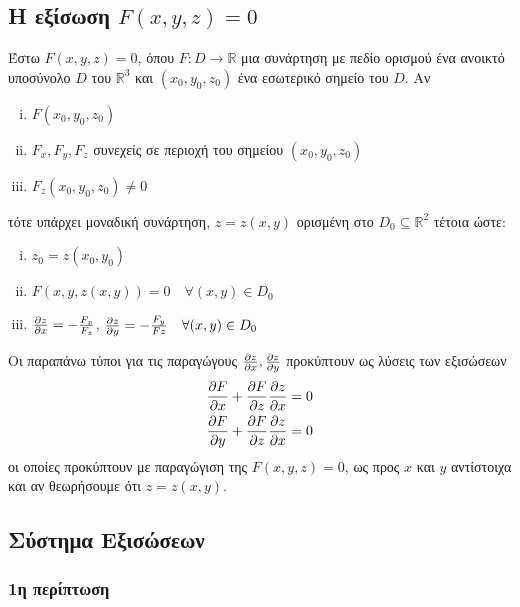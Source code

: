 \subsection{Η εξίσωση $ F(x,y,z) = 0 $}


Έστω $ F(x,y,z) = 0 $, όπου $F\colon D \to \mathbb{R}$ μια συνάρτηση με πεδίο ορισμού ένα ανοικτό
υποσύνολο $ D $ του $ \mathbb{R}^{3}  $ και $ (x_0,y_0,z_0) $ ένα εσωτερικό σημείο του $ D $. Αν
\begin{enumerate}[(i)]
	\item $ F(x_0,y_0,z_0) $
	\item $ F_x, F_y, F_z $ συνεχείς σε περιοχή του σημείου $ (x_0,y_0,z_0) $
	\item $ F_z(x_0,y_0,z_0) \neq 0 $
\end{enumerate}
τότε υπάρχει μοναδική συνάρτηση, $ z=z(x,y) $ ορισμένη στο $ D_0 \subseteq \mathbb{R}^{2} $ τέτοια
ώστε:
\begin{enumerate}[(i)]
	\item $ z_0 = z(x_0,y_0) $
	\item $ F(x,y,z(x,y)) = 0  \quad \forall (x,y)\in  D_0 $
	\item $ \pdv{z}{x} = - \frac{F_x}{F_z} $, $ \pdv{z}{y} = - \frac{F_y}{Fz}\quad \forall (x,y) \in
		D_0$
\end{enumerate}

\begin{rem}
	Οι παραπάνω τύποι για τις παραγώγους $ \pdv{z}{x}, \pdv{z}{y} $ προκύπτουν ως λύσεις των 
	εξισώσεων  
	\begin{align*}	
	\pdv{F}{x} + \pdv{F}{z}\pdv{z}{x} &= 0 \\
	\pdv{F}{y} + \pdv{F}{z}\pdv{z}{x} &= 0 
\end{align*}
	οι οποίες προκύπτουν με παραγώγιση της $ F(x,y,z) = 0 $, ως προς $x$ και $y$ αντίστοιχα και  αν θεωρήσουμε ότι $ z=z(x,y) $.
	
\end{rem}

\subsection{Σύστημα Εξισώσεων}

\subsubsection{1η περίπτωση}

